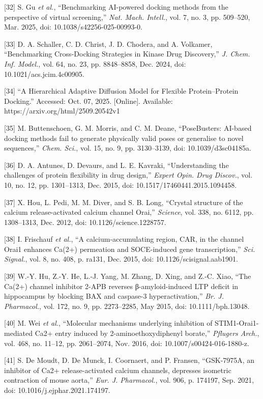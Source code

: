 {[}32{]} S. Gu \emph{et al.}, ``Benchmarking AI-powered docking methods from the perspective of virtual screening,'' \emph{Nat. Mach. Intell.}, vol. 7, no. 3, pp. 509--520, Mar. 2025, doi: 10.1038/s42256-025-00993-0.

{[}33{]} D. A. Schaller, C. D. Christ, J. D. Chodera, and A. Volkamer, ``Benchmarking Cross-Docking Strategies in Kinase Drug Discovery,'' \emph{J. Chem. Inf. Model.}, vol. 64, no. 23, pp. 8848--8858, Dec. 2024, doi: 10.1021/acs.jcim.4c00905.

{[}34{]} ``A Hierarchical Adaptive Diffusion Model for Flexible Protein--Protein Docking.'' Accessed: Oct. 07, 2025. {[}Online{]}. Available: https://arxiv.org/html/2509.20542v1

{[}35{]} M. Buttenschoen, G. M. Morris, and C. M. Deane, ``PoseBusters: AI-based docking methods fail to generate physically valid poses or generalise to novel sequences,'' \emph{Chem. Sci.}, vol. 15, no. 9, pp. 3130--3139, doi: 10.1039/d3sc04185a.

{[}36{]} D. A. Antunes, D. Devaurs, and L. E. Kavraki, ``Understanding the challenges of protein flexibility in drug design,'' \emph{Expert Opin. Drug Discov.}, vol. 10, no. 12, pp. 1301--1313, Dec. 2015, doi: 10.1517/17460441.2015.1094458.

{[}37{]} X. Hou, L. Pedi, M. M. Diver, and S. B. Long, ``Crystal structure of the calcium release-activated calcium channel Orai,'' \emph{Science}, vol. 338, no. 6112, pp. 1308--1313, Dec. 2012, doi: 10.1126/science.1228757.

{[}38{]} I. Frischauf \emph{et al.}, ``A calcium-accumulating region, CAR, in the channel Orai1 enhances Ca(2+) permeation and SOCE-induced gene transcription,'' \emph{Sci. Signal.}, vol. 8, no. 408, p. ra131, Dec. 2015, doi: 10.1126/scisignal.aab1901.

{[}39{]} W.-Y. Hu, Z.-Y. He, L.-J. Yang, M. Zhang, D. Xing, and Z.-C. Xiao, ``The Ca(2+) channel inhibitor 2-APB reverses β-amyloid-induced LTP deficit in hippocampus by blocking BAX and caspase-3 hyperactivation,'' \emph{Br. J. Pharmacol.}, vol. 172, no. 9, pp. 2273--2285, May 2015, doi: 10.1111/bph.13048.

{[}40{]} M. Wei \emph{et al.}, ``Molecular mechanisms underlying inhibition of STIM1-Orai1-mediated Ca2+ entry induced by 2-aminoethoxydiphenyl borate,'' \emph{Pflugers Arch.}, vol. 468, no. 11--12, pp. 2061--2074, Nov. 2016, doi: 10.1007/s00424-016-1880-z.

{[}41{]} S. De Moudt, D. De Munck, I. Coornaert, and P. Fransen, ``GSK-7975A, an inhibitor of Ca2+ release-activated calcium channels, depresses isometric contraction of mouse aorta,'' \emph{Eur. J. Pharmacol.}, vol. 906, p. 174197, Sep. 2021, doi: 10.1016/j.ejphar.2021.174197.

